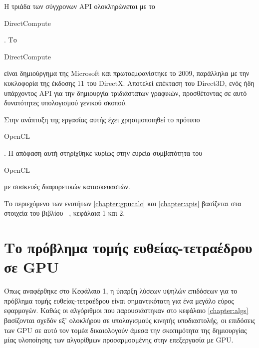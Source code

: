 Η τριάδα των σύγχρονων API ολοκληρώνεται με το \begin{english}DirectCompute\end{english}. Το \begin{english}DirectCompute\end{english} είναι δημιούργημα της Microsoft και πρωτοεμφανίστηκε το 2009, παράλληλα με την κυκλοφορία της έκδοσης 11 του DirectX. Αποτελεί επέκταση του Direct3D, ενός ήδη υπάρχοντος API για την δημιουργία τριδιάστατων γραφικών, προσθέτοντας σε αυτό δυνατότητες υπολογισμού γενικού σκοπού.

Στην ανάπτυξη της εργασίας αυτής έχει χρησιμοποιηθεί το πρότυπο \begin{english}OpenCL\end{english}. Η απόφαση αυτή στηρίχθηκε κυρίως στην ευρεία συμβατότητα του \begin{english}OpenCL\end{english} με συσκευές διαφορετικών κατασκευαστών. 

Το περιεχόμενο των ενοτήτων \ref{chapter:gpucalc} και \ref{chapter:apis} βασίζεται στα στοιχεία του βιβλίου ~\cite{MassivelyParallel}, κεφάλαια 1 και 2.


\section{Το πρόβλημα τομής ευθείας-τετραέδρου σε GPU}
\label{chapter:openclraytetra}
\noindent Όπως αναφέρθηκε στο Κεφάλαιο 1, η ύπαρξη λύσεων υψηλών επιδόσεων για το πρόβλημα τομής ευθείας-τετραέδρου είναι σημαντικότατη για ένα μεγάλο εύρος εφαρμογών. Καθώς οι αλγόριθμοι που παρουσιάστηκαν στο κεφάλαιο \ref{chapter:algs} βασίζονται σχεδόν εξ' ολοκλήρου σε υπολογισμούς κινητής υποδιαστολής, οι επιδόσεις των GPU σε αυτό τον τομέα δικαιολογούν άμεσα την σκοπιμότητα της δημιουργίας μίας υλοποίησης των αλγορίθμων προσαρμοσμένης στην επεξεργασία με GPU.

